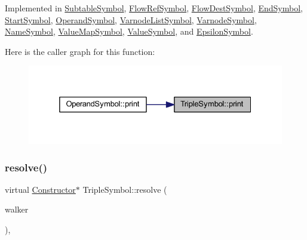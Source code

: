 Implemented in \mbox{\hyperlink{class_subtable_symbol_a26cbcfbd3b82eddffb9ba3c3beb0b5ac}{Subtable\+Symbol}}, \mbox{\hyperlink{class_flow_ref_symbol_a8f6e9171c4a26b35f20e6026aafa94a2}{Flow\+Ref\+Symbol}}, \mbox{\hyperlink{class_flow_dest_symbol_a94cdef08349b4081b2559fc39037fcce}{Flow\+Dest\+Symbol}}, \mbox{\hyperlink{class_end_symbol_ab80ec6e31015b71ceb133aea5ec8d10b}{End\+Symbol}}, \mbox{\hyperlink{class_start_symbol_a973289b5a20d276346089365cc24905f}{Start\+Symbol}}, \mbox{\hyperlink{class_operand_symbol_a6aae865579741ebe784ba0782c0192ec}{Operand\+Symbol}}, \mbox{\hyperlink{class_varnode_list_symbol_a3dbd47d58a39197a6126fec8a0b11be4}{Varnode\+List\+Symbol}}, \mbox{\hyperlink{class_varnode_symbol_a10b765544964a8f2b84072676fc945ff}{Varnode\+Symbol}}, \mbox{\hyperlink{class_name_symbol_a611940036621c526ec59691bc8a749bb}{Name\+Symbol}}, \mbox{\hyperlink{class_value_map_symbol_a706eaaae2c92d3927855bc34d10f2cc1}{Value\+Map\+Symbol}}, \mbox{\hyperlink{class_value_symbol_a82b3d3fbfc6d3ed118103f12220cdfd4}{Value\+Symbol}}, and \mbox{\hyperlink{class_epsilon_symbol_aecbc7388e707d9e11625a9b4436f73a4}{Epsilon\+Symbol}}.

Here is the caller graph for this function\+:
\nopagebreak
\begin{figure}[H]
\begin{center}
\leavevmode
\includegraphics[width=325pt]{class_triple_symbol_a205c4487d3ad54532097dd77eb4501fc_icgraph}
\end{center}
\end{figure}
\mbox{\label{class_triple_symbol_adc7ba86d4674c1b3cc8894cfcac33bf1}} 
\subsubsection{\texorpdfstring{resolve()}{resolve()}}
{\footnotesize\ttfamily virtual \mbox{\hyperlink{class_constructor}{Constructor}}$\ast$ Triple\+Symbol\+::resolve (\begin{DoxyParamCaption}\item[{\mbox{\hyperlink{class_parser_walker}{Parser\+Walker}} \&}]{walker }\end{DoxyParamCaption})\hspace{0.3cm}{\ttfamily [inline]}, {\ttfamily [virtual]}}



